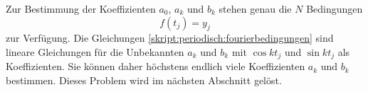 Zur Bestimmung der Koeffizienten $a_0$, $a_k$ und $b_k$ stehen genau
die $N$ Bedingungen
\begin{equation}
f(t_j)=y_j
\label{skript:periodisch:fourierbedingungen}
\end{equation}
zur Verfügung.
Die Gleichungen \eqref{skript:periodisch:fourierbedingungen} sind
lineare Gleichungen für die Unbekannten $a_k$ und $b_k$ mit
$\cos kt_j$ und $\sin kt_j$ als Koeffizienten.
Sie können daher höchstens endlich viele Koeffizienten $a_k$ und $b_k$
bestimmen.
Dieses Problem wird im nächsten Abschnitt gelöst.

